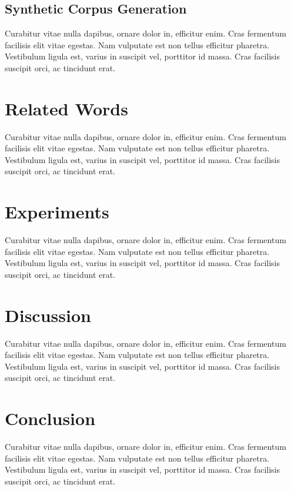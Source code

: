 \documentclass[sigconf, nonacm]{acmart}
\begin{document}
\subsection{Synthetic Corpus Generation}

Curabitur vitae nulla dapibus, ornare dolor in, efficitur enim. Cras fermentum facilisis elit vitae egestas. Nam vulputate est non tellus efficitur pharetra. Vestibulum ligula est, varius in suscipit vel, porttitor id massa. Cras facilisis suscipit orci, ac tincidunt erat.

\section{Related Words}
Curabitur vitae nulla dapibus, ornare dolor in, efficitur enim. Cras fermentum facilisis elit vitae egestas. Nam vulputate est non tellus efficitur pharetra. Vestibulum ligula est, varius in suscipit vel, porttitor id massa. Cras facilisis suscipit orci, ac tincidunt erat.

\section{Experiments}
Curabitur vitae nulla dapibus, ornare dolor in, efficitur enim. Cras fermentum facilisis elit vitae egestas. Nam vulputate est non tellus efficitur pharetra. Vestibulum ligula est, varius in suscipit vel, porttitor id massa. Cras facilisis suscipit orci, ac tincidunt erat.

\section{Discussion}

Curabitur vitae nulla dapibus, ornare dolor in, efficitur enim. Cras fermentum facilisis elit vitae egestas. Nam vulputate est non tellus efficitur pharetra. Vestibulum ligula est, varius in suscipit vel, porttitor id massa. Cras facilisis suscipit orci, ac tincidunt erat.

\section{Conclusion}

Curabitur vitae nulla dapibus, ornare dolor in, efficitur enim. Cras fermentum facilisis elit vitae egestas. Nam vulputate est non tellus efficitur pharetra. Vestibulum ligula est, varius in suscipit vel, porttitor id massa. Cras facilisis suscipit orci, ac tincidunt erat.
\end{document}
